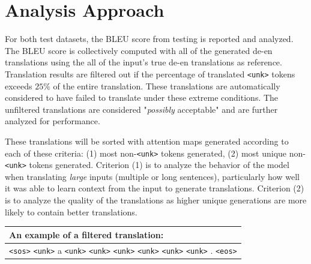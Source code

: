 \documentclass[11pt,a4paper]{article}
\begin{document}


\section{Analysis Approach}
For both test datasets, the BLEU score from testing is reported and analyzed. The BLEU score is collectively computed with all of the generated de-en translations using the all of the input's true de-en translations as reference. Translation results are filtered out if the percentage of translated \verb|<unk>| tokens exceeds $25\%$ of the entire translation. These translations are automatically considered to have failed to translate under these extreme conditions. The unfiltered translations are considered "\textit{possibly} acceptable" and are further analyzed for performance. 

These translations will be sorted with attention maps generated according to each of these criteria: (1) most non-\verb|<unk>| tokens generated, (2) most unique non-\verb|<unk>| tokens generated. Criterion (1) is to analyze the behavior of the model when translating \textit{large} inputs (multiple or long sentences), particularly how well it was able to learn context from the input to generate translations. Criterion (2) is to analyze the quality of the translations as higher unique generations are more likely to contain better translations.

\begin{center}
\begin{tabular}{p{2.5in}}
    An example of a filtered translation:\\
    \hline
    \verb|<sos>| \verb|<unk>| a \verb|<unk>| \verb|<unk>| \verb|<unk>| \verb|<unk>| \verb|<unk>| \verb|<unk>| . \verb|<eos>|\\
    \hline
\end{tabular}
\end{center}
\end{document}
